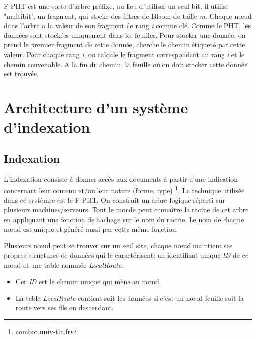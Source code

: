 \documentclass[a4paper,11pt]{report}
\begin{document}
	F-PHT est une sorte d'arbre préfixe, au lieu d'utiliser un seul bit, il utilise "multibit", un fragment, qui stocke des filtres de Bloom de taille \textit{m}. Chaque nœud dans l'arbre a la valeur de son fragment de rang \textit{i} comme clé. Comme le PHT, les données sont stockées uniquement dans les feuilles. Pour stocker une donnée, on prend le premier fragment de cette donnée, cherche le chemin étiqueté par cette valeur. Pour chaque rang \textit{i}, on calcule le fragment correspondant au rang \textit{i} et le chemin convenable. A la fin du chemin, la feuille où on doit stocker cette donnée est trouvée.
	
\chapter{Architecture d'un système d'indexation}
\section{Indexation}
	L'indexation consiste à donner accès aux documents à partir d'une indication concernant leur contenu et/ou leur nature (forme, type) \footnote{combot.univ-tln.fr}. La technique utilisée dans ce systèmre est le F-PHT. On construit un arbre logique réparti sur plusieurs machines/serveurs. Tout le monde peut connaître la racine de cet arbre en appliquant une fonction de hachage sur le nom du racine. Le nom de chaque nœud est unique et généré aussi par cette même fonction. 
	
	Plusieurs nœud peut se trouver sur un seul site, chaque nœud maintient ses propres structures de données qui le caractérisent: un identifiant unique \textit{ID} de ce nœud et une table nommée \textit{LocalRoute}.
	\begin{itemize}
		\item Cet \textit{ID} est le chemin unique qui mène au nœud.
		\item La table \textit{LocalRoute} contient soit les données si c'est un nœud feuille soit la route vers ses fils en descendant.
	\end{itemize}
	
\end{document}
